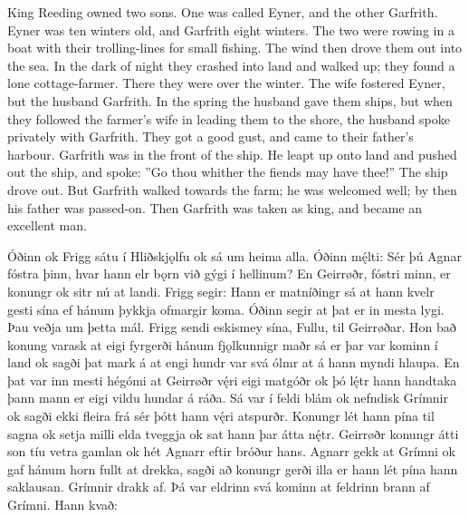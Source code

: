 \bpb King Reeding owned two sons. One was called Eyner, and the other Garfrith.
Eyner was ten winters old, and Garfrith eight winters. The two were rowing in a boat with their trolling-lines for small fishing.
The wind then drove them out into the sea. In the dark of night they crashed into land and walked up; they found a lone cottage-farmer.
There they were over the winter. The wife fostered Eyner, but the husband Garfrith.
In the spring the husband gave them ships, but when they followed the farmer’s wife in leading them to the shore, the husband spoke privately with Garfrith.
They got a good gust, and came to their father’s harbour. Garfrith was in the front of the ship.
He leapt up onto land and pushed out the ship, and spoke: ”Go thou whither the fiends may have thee!”
The ship drove out. But Garfrith walked towards the farm; he was welcomed well; by then his father was passed-on.
Then Garfrith was taken as king, and became an excellent man.\epb
\epg


\bpg
\bpa[1b]Óðinn ok Frigg sátu í Hliðskjǫlfu ok sá um heima alla.
Óðinn mę́lti: Sér þú Agnar fóstra þinn, hvar hann elr bǫrn við gýgi í hellinum?
En Geirrøðr, fóstri minn, er konungr ok sitr nú at landi.
Frigg segir: Hann er matníðingr sá at hann kvelr gesti sína ef hánum þykkja ofmargir koma.
Óðinn segir at þat er in mesta lygi. Þau veðja um þetta mál.
Frigg sendi eskismey sína, Fullu, til Geirrøðar. Hon bað konung varask at eigi fyrgerði hánum fjǫlkunnigr maðr sá er þar var kominn í land ok sagði þat mark á at engi hundr var svá ólmr at á hann myndi hlaupa.
En þat var inn mesti hégómi at Geirrøðr vę́ri eigi matgóðr ok þó lę́tr hann handtaka þann mann er eigi vildu hundar á ráða.
Sá var í feldi blám ok nefndisk Grímnir ok sagði ekki fleira frá sér þótt hann vę́ri atspurðr.
Konungr lét hann pína til sagna ok setja milli elda tveggja ok sat hann þar átta nę́tr.
Geirrøðr konungr átti son tíu vetra gamlan ok hét Agnarr eftir bróður hans.
Agnarr gekk at Grímni ok gaf hánum horn fullt at drekka, sagði að konungr gerði illa er hann lét pína hann saklausan.
Grímnir drakk af. Þá var eldrinn svá kominn at feldrinn brann af Grímni. Hann kvað:\epa

